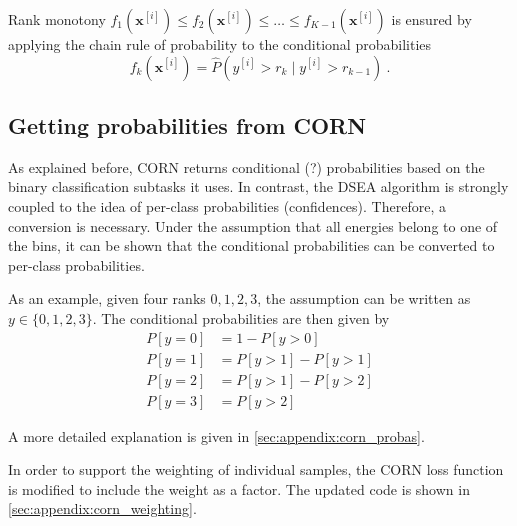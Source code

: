 Rank monotony
  $f_1(\mathbf{x}^{[i]}) \leq f_2(\mathbf{x}^{[i]}) \leq \ldots \leq f_{K-1}(\mathbf{x}^{[i]})$
is ensured by
applying the chain rule of probability
to the conditional probabilities
\begin{equation}
  f_k(\mathbf{x}^{[i]}) = \hat{P}\left( y^{[i]} > r_k \mid y^{[i]} > r_{k-1} \right) \ .
\end{equation}





\subsection{Getting probabilities from CORN} %
As explained before,
CORN returns conditional (?) probabilities based on the binary classification subtasks it uses.
In contrast,
the DSEA algorithm is strongly coupled to the idea of per-class probabilities (confidences).
Therefore, a conversion is necessary.
Under the assumption that all energies belong to one of the bins,
it can be shown that the conditional probabilities can be converted to per-class probabilities.

As an example, given four ranks $0, 1, 2, 3$,
the assumption can be written as $y \in \{0, 1, 2, 3\}$.
The conditional probabilities are then given by
\begin{align*}
  P[y=0] &= 1 - P[y>0] \\
  P[y=1] &= P[y>1] - P[y>1] \\
  P[y=2] &= P[y>1] - P[y>2] \\
  P[y=3] &= P[y>2]
\end{align*}

A more detailed explanation is given in \autoref{sec:appendix:corn_probas}.

In order to support the weighting of individual samples,
the CORN loss function is modified
to include the weight as a factor.
The updated code is shown in \autoref{sec:appendix:corn_weighting}.
